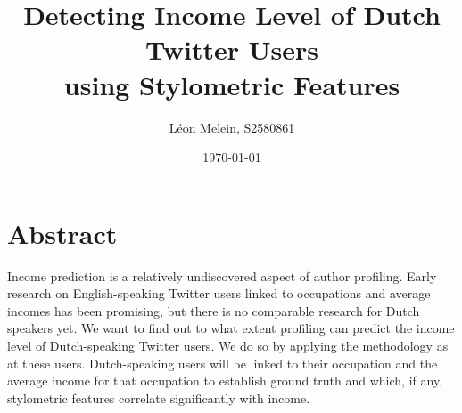 \documentclass[11pt, a4paper]{article}
\begin{document}
\title{Detecting Income Level of Dutch Twitter Users\\using Stylometric Features}
\author{L\'eon Melein, S2580861}
\date{\today}
\maketitle
\section*{Abstract}
Income prediction is a relatively undiscovered aspect of author profiling. Early research on English-speaking Twitter users linked to occupations and average incomes has been promising, but there is no comparable research for Dutch speakers yet. We want to find out to what extent profiling can predict the income level of Dutch-speaking Twitter users. We do so by applying the methodology as \citet{flekova} at these users. Dutch-speaking users will be linked to their occupation and the average income for that occupation to establish ground truth and which, if any, stylometric features correlate significantly with income.
\newpage
\end{document}
